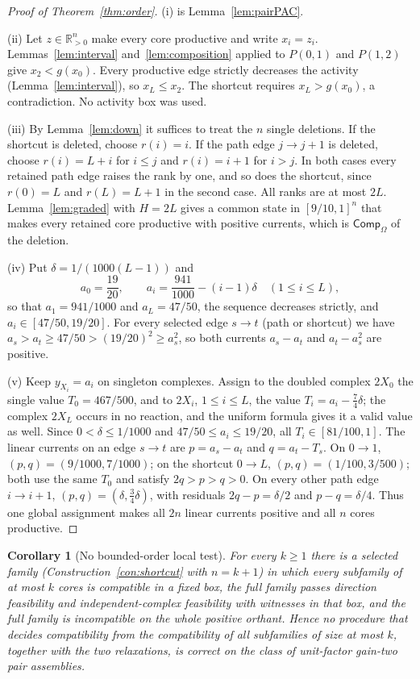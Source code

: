 \documentclass[11pt,a4paper]{article}
\theoremstyle{plain}
\newtheorem{corollary}[theorem]{Corollary}
\theoremstyle{definition}
\theoremstyle{remark}
\newcommand{\R}{\mathbb{R}}
\newcommand{\Rpos}{\R_{>0}}
\newcommand{\Comp}{\mathsf{Comp}}
\begin{document}
\begin{proof}[Proof of Theorem~\ref{thm:order}]
(i) is Lemma~\ref{lem:pairPAC}.

(ii) Let $z\in\Rpos^n$ make every core productive and write $x_i=z_i$. Lemmas~\ref{lem:interval} and~\ref{lem:composition} applied to $P(0,1)$ and $P(1,2)$ give $x_2<g(x_0)$. Every productive edge strictly decreases the activity (Lemma~\ref{lem:interval}), so $x_L\le x_2$. The shortcut requires $x_L>g(x_0)$, a contradiction. No activity box was used.

(iii) By Lemma~\ref{lem:down} it suffices to treat the $n$ single deletions. If the shortcut is deleted, choose $r(i)=i$. If the path edge $j\to j+1$ is deleted, choose $r(i)=L+i$ for $i\le j$ and $r(i)=i+1$ for $i>j$. In both cases every retained path edge raises the rank by one, and so does the shortcut, since $r(0)=L$ and $r(L)=L+1$ in the second case. All ranks are at most $2L$. Lemma~\ref{lem:graded} with $H=2L$ gives a common state in $[9/10,1]^n$ that makes every retained core productive with positive currents, which is $\Comp_\Omega$ of the deletion.

(iv) Put $\delta=1/(1000(L-1))$ and
\[
a_0=\frac{19}{20},\qquad a_i=\frac{941}{1000}-(i-1)\delta\quad(1\le i\le L),
\]
so that $a_1=941/1000$ and $a_L=47/50$, the sequence decreases strictly, and $a_i\in[47/50,19/20]$. For every selected edge $s\to t$ (path or shortcut) we have $a_s>a_t\ge47/50>(19/20)^2\ge a_s^2$, so both currents $a_s-a_t$ and $a_t-a_s^2$ are positive.

(v) Keep $y_{X_i}=a_i$ on singleton complexes. Assign to the doubled complex $2X_0$ the single value $T_0=467/500$, and to $2X_i$, $1\le i\le L$, the value $T_i=a_i-\tfrac74\delta$; the complex $2X_L$ occurs in no reaction, and the uniform formula gives it a valid value as well. Since $0<\delta\le1/1000$ and $47/50\le a_i\le19/20$, all $T_i\in[81/100,1]$. The linear currents on an edge $s\to t$ are $p=a_s-a_t$ and $q=a_t-T_s$. On $0\to1$, $(p,q)=(9/1000,7/1000)$; on the shortcut $0\to L$, $(p,q)=(1/100,3/500)$; both use the same $T_0$ and satisfy $2q>p>q>0$. On every other path edge $i\to i+1$, $(p,q)=(\delta,\tfrac34\delta)$, with residuals $2q-p=\delta/2$ and $p-q=\delta/4$. Thus one global assignment makes all $2n$ linear currents positive and all $n$ cores productive.
\end{proof}

\begin{corollary}[No bounded-order local test]\label{cor:local}
For every $k\ge1$ there is a selected family (Construction~\ref{con:shortcut} with $n=k+1$) in which every subfamily of at most $k$ cores is compatible in a fixed box, the full family passes direction feasibility and independent-complex feasibility with witnesses in that box, and the full family is incompatible on the whole positive orthant. Hence no procedure that decides compatibility from the compatibility of all subfamilies of size at most $k$, together with the two relaxations, is correct on the class of unit-factor gain-two pair assemblies.
\end{corollary}
\end{document}
